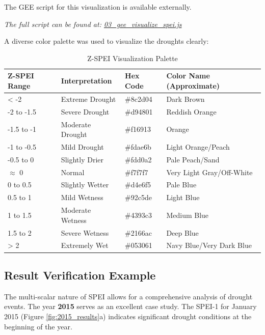 \documentclass[12pt, a4paper]{article}
\begin{document}
The GEE script for this visualization is available externally.
\begin{center}
    \textit{The full script can be found at: \href{https://github.com/Actuallyanonymous/spei-drought-analysis-pipeline/blob/main/scripts/03_gee_visualize_spei.js}{03\_gee\_visualize\_spei.js}}
\end{center}

A diverse color palette was used to visualize the droughts clearly:
\begin{table}[h!]
    \centering
    \caption{Z-SPEI Visualization Palette}
    \begin{tabular}{llll}
        \toprule
        \textbf{Z-SPEI Range} & \textbf{Interpretation} & \textbf{Hex Code} & \textbf{Color Name (Approximate)} \\
        \midrule
        < -2 & Extreme Drought & \#8c2d04 & Dark Brown \\
        -2 to -1.5 & Severe Drought & \#d94801 & Reddish Orange \\
        -1.5 to -1 & Moderate Drought & \#f16913 & Orange \\
        -1 to -0.5 & Mild Drought & \#fdae6b & Light Orange/Peach \\
        -0.5 to 0 & Slightly Drier & \#fdd0a2 & Pale Peach/Sand \\
        $\approx$ 0 & Normal & \#f7f7f7 & Very Light Gray/Off-White \\
        0 to 0.5 & Slightly Wetter & \#d4e6f5 & Pale Blue \\
        0.5 to 1 & Mild Wetness & \#92c5de & Light Blue \\
        1 to 1.5 & Moderate Wetness & \#4393c3 & Medium Blue \\
        1.5 to 2 & Severe Wetness & \#2166ac & Deep Blue \\
        > 2 & Extremely Wet & \#053061 & Navy Blue/Very Dark Blue \\
        \bottomrule
    \end{tabular}
\end{table}

\subsection{Result Verification Example}
The multi-scalar nature of SPEI allows for a comprehensive analysis of drought events. The year \textbf{2015} serves as an excellent case study. The SPEI-1 for January 2015 (Figure \ref{fig:2015_results}a) indicates significant drought conditions at the beginning of the year.
\end{document}
